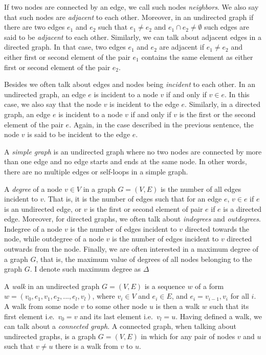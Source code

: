 If two nodes are connected by an edge, we call such nodes \emph{neighbors}. We
also say that such nodes are \emph{adjacent} to each other. Moreover, in an undirected graph
if there are two edges $e_1$ and $e_2$ such that $e_1 \neq e_2$ and $e_1 \cap e_2 \neq \emptyset$
such edges are said to be \emph{adjacent} to each other. Similarly, we can talk about adjacent 
edges in a directed graph. In that case, two edges $e_1$ and $e_2$ are adjacent if
$e_1 \neq e_2$ and either first or second element of the pair $e_1$ contains the same
element as either first or second element of the pair $e_2$.

Besides we often talk about edges and nodes being \emph{incident} to each other.
In an undirected graph, an edge $e$ is incident to a node $v$ if and only if $v \in e$. In this
case, we also say that the node $v$ is incident to the edge $e$. Similarly, in a
directed graph, an edge $e$ is incident to a node $v$ if and only if $v$ is the
first or the second element of the pair $e$. Again, in the case described in the
previous sentence, the node $v$ is said to be incident to the edge $e$.

A \emph{simple graph} is an undirected graph where no two nodes are connected by more
than one edge and no edge starts and ends at the same node. In other words, there are
no multiple edges or self-loops in a simple graph.

A \emph{degree} of a node $v \in V$ in a graph $G = (V, E)$ is the number of all
edges incident to $v$. That is, it is the number of edges such that for an edge
$e$, $v \in e$ if $e$ is an undirected edge, or $v$ is the first or second element of
pair $e$ if $e$ is a directed edge. Moreover, for directed graphs, we often talk
about \emph{indegrees} and \emph{outdegrees}. Indegree of a node $v$ is the number
of edges incident to $v$ directed towards the node, while outdegree of a node $v$ is the 
number of edges incident to $v$ directed outwards from the node. Finally, we are 
often interested in a maximum degree of a graph $G$, that is, the maximum value of
degrees of all nodes belonging to the graph $G$. I denote such maximum degree as
$\Delta$

A \emph{walk} in an undirected graph $G = (V, E)$ is a sequence $w$ of a form
$w = (v_0, e_1, v_1, e_2, ..., e_l, v_l)$,
where $v_i \in V$ and $e_i \in E$, and $e_i = {v_{i-1}, v_i}$ for all $i$. A walk from some
node $v$ to some other node $u$ is then a walk $w$ such that its first element i.e.\ $v_0 = v$
and its last element i.e.\ $v_l = u$. Having defined a walk, we can talk about a \emph{
connected graph}. A connected graph, when talking about undirected
graphs, is a graph $G = (V, E)$ in which for any pair of nodes $v$ and $u$ such that
$v \neq u$ there is a walk from $v$ to $u$.


